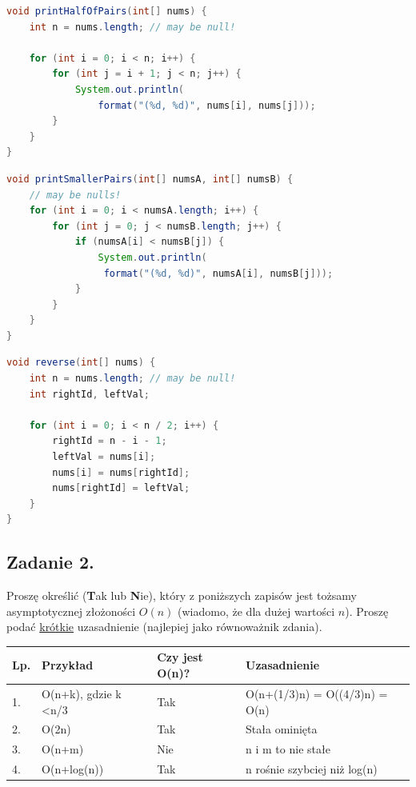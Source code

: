 \documentclass[twoside]{article}
\begin{document}
\begin{lstlisting}[caption={Zad. 1 (A)}, frame=tblr, language=Java]
void printHalfOfPairs(int[] nums) {
    int n = nums.length; // may be null!

    for (int i = 0; i < n; i++) {
        for (int j = i + 1; j < n; j++) {
            System.out.println(
                format("(%d, %d)", nums[i], nums[j]));
        }
    }
}
\end{lstlisting}

\begin{lstlisting}[caption={Zad. 1 (B)}, frame=tblr, language=Java]
void printSmallerPairs(int[] numsA, int[] numsB) {
    // may be nulls!
    for (int i = 0; i < numsA.length; i++) {
        for (int j = 0; j < numsB.length; j++) {
            if (numsA[i] < numsB[j]) {
                System.out.println(
                 format("(%d, %d)", numsA[i], numsB[j]));
            }
        }
    }
}
\end{lstlisting}

\begin{lstlisting}[caption={Zad. 1 (C)}, frame=tblr, language=Java]
void reverse(int[] nums) {
    int n = nums.length; // may be null!
    int rightId, leftVal;

    for (int i = 0; i < n / 2; i++) {
        rightId = n - i - 1;
        leftVal = nums[i];
        nums[i] = nums[rightId];
        nums[rightId] = leftVal;
    }
}
\end{lstlisting}

\subsection{Zadanie 2.}
Proszę określić (\textbf{T}ak lub \textbf{N}ie), który z poniższych zapisów jest tożsamy asymptotycznej złożoności $O(n)$ (wiadomo, że dla dużej wartości $n$). Proszę podać \underline{krótkie} uzasadnienie (najlepiej jako równoważnik zdania).

\begin{table}[h]
\begin{tabular}{|l|l|l|l|}
\hline
Lp. & Przykład                      & Czy jest O(n)? & Uzasadnienie \\ \hline
1.  & O(n+k), gdzie k \textless n/3 & Tak               & O(n+(1/3)n) = O((4/3)n) = O(n)              \\ \hline
2.  & O(2n)                         & Tak               & Stała ominięta             \\ \hline
3.  & O(n+m)                        & Nie               & n i m to nie stałe             \\ \hline
4.  & O(n+log(n))                   & Tak               & n rośnie szybciej niż log(n)             \\ \hline
\end{tabular}
\end{table}
\end{document}
